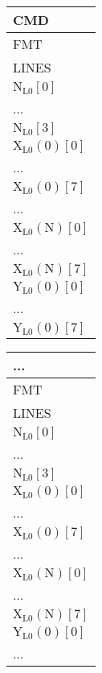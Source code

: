 \documentclass[12pt,parskip=full]{article}
\numberwithin{subsection}{section}
\begin{document}
			\begin{centering}
				\begin{tabular}{| C{2cm} |}
					\hline
					CMD \\
					\hline
					FMT \\
					\hline
					LINES \\
					\hline
					$\mathrm{N_{L0}[0]}$ \\
					\hline
					... \\
					\hline
					$\mathrm{N_{L0}[3]}$ \\
					\hline
					$\mathrm{X_{L0}(0)[0]}$ \\
					\hline
					... \\
					\hline
					$\mathrm{X_{L0}(0)[7]}$ \\
					\hline
					... \\
					\hline
					$\mathrm{X_{L0}(N)[0]}$ \\
					\hline
					... \\
					\hline
					$\mathrm{X_{L0}(N)[7]}$ \\
					\hline
					$\mathrm{Y_{L0}(0)[0]}$ \\
					\hline
					...\\
					\hline
					$\mathrm{Y_{L0}(0)[7]}$ \\
					\hline
				\end{tabular}
				\begin{tabular}{| C{2cm} |}
					\hline
					... \\
					\hline
					FMT \\
					\hline
					LINES \\
					\hline
					$\mathrm{N_{L0}[0]}$ \\
					\hline
					... \\
					\hline
					$\mathrm{N_{L0}[3]}$ \\
					\hline
					$\mathrm{X_{L0}(0)[0]}$ \\
					\hline
					... \\
					\hline
					$\mathrm{X_{L0}(0)[7]}$ \\
					\hline
					... \\
					\hline
					$\mathrm{X_{L0}(N)[0]}$ \\
					\hline
					... \\
					\hline
					$\mathrm{X_{L0}(N)[7]}$ \\
					\hline
					$\mathrm{Y_{L0}(0)[0]}$ \\
					\hline
					...\\
					\hline
				\end{tabular}
			\end{centering}
\end{document}
